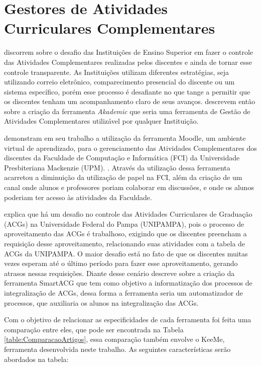 \section{Gestores de Atividades Curriculares Complementares}
\label{sec:gestativcomplem}

\cite{de2018implementaccao} discorrem sobre o desafio das Instituições de Ensino Superior em fazer o controle das Atividades Complementares realizadas pelos discentes e ainda de tornar esse controle transparente. As Instituições utilizam diferentes estratégias, seja utilizando correio eletrônico, comparecimento presencial do discente ou um sistema específico, porém esse processo é desafiante no que tange a permitir que os discentes tenham um acompanhamento claro de seus avanços. \cite{de2018implementaccao} descrevem então sobre a criação da ferramenta \textit{Akademic} que seria uma ferramenta de Gestão de Atividades Complementares utilizável por qualquer Instituição.

\cite{silva2013processo} demonstram em seu trabalho a utilização da ferramenta Moodle, um ambiente virtual de aprendizado, para o gerenciamento das Atividades Complementares dos discentes da  Faculdade de Computação e Informática (FCI) da Universidade Presbiteriana Mackenzie (UPM). \cite{silva2013processo}. Através da utilização dessa ferramenta acarretou a diminuição da utilização de papel na FCI, além da criação de um canal onde alunos e professores poriam colaborar em discussões, e onde os alunos poderiam ter acesso às atividades da Faculdade.


\cite{cunha2014unipampa} explica que há um desafio no controle das Atividades Curriculares de Graduação (ACGs) na Universidade Federal do Pampa (UNIPAMPA), pois o processo de aproveitamento das ACGs é trabalhoso, exigindo que os discentes preencham a requisição desse aproveitamento, relacionando suas atividades com a tabela de ACGs da UNIPAMPA. O maior desafio está no fato de que os discentes muitas vezes esperam até o último período para fazer esse aproveitamento, gerando atrasos nessas requisições. Diante desse cenário \cite{cunha2014unipampa} descreve sobre a criação da ferramenta SmartACG que tem como objetivo a informatização dos processos de integralização de ACGs, dessa forma a ferramenta seria um automatizador de processos, que auxiliaria os alunos na integralização das ACGs.

Com o objetivo de relacionar as especificidades de cada ferramenta foi feita uma comparação entre eles, que pode ser encontrada na Tabela \ref{table:ComparacaoArtigos}, essa comparação também envolve o KeeMe, ferramenta desenvolvida neste trabalho. As seguintes características serão abordados na tabela:

